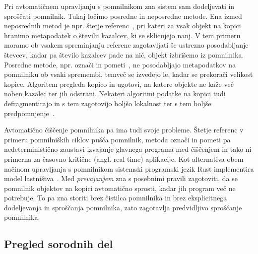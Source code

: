 \documentclass[a4paper, 12pt]{article}
\begin{document}
Pri avtomatičnem upravljanju s pomnilnikom zna sistem sam dodeljevati in sproščati pomnilnik. Tukaj ločimo posredne in neposredne metode. Ena izmed neposrednih metod je npr. štetje referenc~\cite{collins1960method}, pri kateri za vsak objekt na kopici hranimo metapodatek o številu kazalcev, ki se sklicujejo nanj. V tem primeru moramo ob vsakem spreminjanju referenc zagotavljati še ustrezno posodabljanje števcev, kadar pa število kazalcev pade na nič, objekt izbrišemo iz pomnilnika. Posredne metode, npr. označi in pometi~\cite{mccarthy1960recursive}, ne posodabljajo metapodatkov na pomnilniku ob vsaki spremembi, temveč se izvedejo le, kadar se prekorači velikost kopice. Algoritem pregleda kopico in ugotovi, na katere objekte ne kaže več noben kazalec ter jih odstrani. Nekateri algoritmi podatke na kopici tudi defragmentirajo in s tem zagotovijo boljšo lokalnost ter s tem boljše predpomnjenje~\cite{fenichel1969lisp}. 

Avtomatično čiščenje pomnilnika pa ima tudi svoje probleme. Štetje referenc v primeru pomnilniških ciklov pušča pomnilnik, metoda označi in pometi pa nedeterministično zaustavi izvajanje glavnega programa med čiščenjem in tako ni primerna za časovno-kritične (angl. real-time) aplikacije. Kot alternativa obem načinom upravljanja s pomnilnikom sistemski programski jezik Rust implementira model lastništva~\cite{klabnik2023rust}. Med \textit{prevajanjem} zna s posebnimi pravili zagotoviti, da se pomnilnik objektov na kopici avtomatično sprosti, kadar jih program več ne potrebuje. To pa zna storiti brez čistilca pomnilnika in brez eksplicitnega dodeljevanja in sproščanja pomnilnika, zato zagotavlja predvidljivo sproščanje pomnilnika.


\subsection{Pregled sorodnih del}

\end{document}
